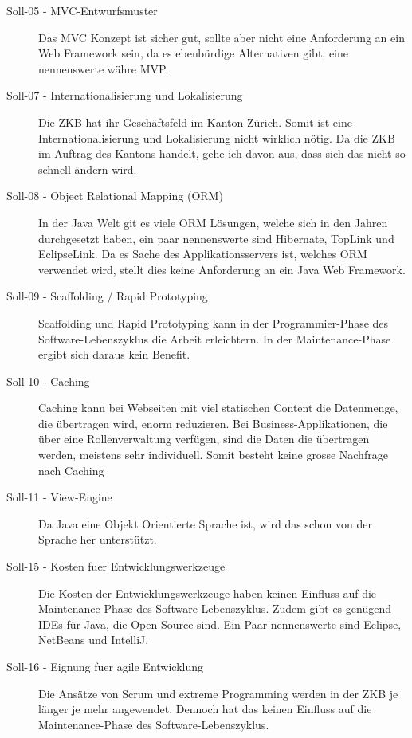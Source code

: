   \begin{description}
  \item[Soll-05 - MVC-Entwurfsmuster]
  Das \ac{MVC} Konzept ist sicher gut, sollte aber nicht eine Anforderung an ein
  Web Framework sein, da es ebenbürdige Alternativen gibt, eine nennenswerte währe
  \ac{MVP}.
  
  \item[Soll-07 - Internationalisierung und Lokalisierung]
  Die \ac{ZKB} hat ihr Geschäftsfeld im Kanton Zürich. Somit ist eine
  Internationalisierung und Lokalisierung nicht wirklich nötig. Da die \ac{ZKB}
  im Auftrag des Kantons handelt, gehe ich davon aus, dass sich das nicht so
  schnell ändern wird.
  
  \item[Soll-08 - Object Relational Mapping (ORM)]
  In der Java Welt git es viele \ac{ORM} Lösungen, welche sich in den Jahren
  durchgesetzt haben, ein paar nennenswerte sind Hibernate, TopLink und
  EclipseLink. Da es Sache des Applikationsservers ist, welches \ac{ORM}
  verwendet wird, stellt dies keine Anforderung an ein Java Web Framework.
  
  \item[Soll-09 - Scaffolding / Rapid Prototyping]
  Scaffolding und Rapid Prototyping kann in der Programmier-Phase des
  Software-Lebenszyklus die Arbeit erleichtern. In der Maintenance-Phase
  ergibt sich daraus kein Benefit.
  
  \item[Soll-10 - Caching]
  Caching kann bei Webseiten mit viel statischen Content die Datenmenge, die
  übertragen wird, enorm reduzieren. Bei Business-Applikationen, die über eine
  Rollenverwaltung verfügen, sind die Daten die übertragen werden, meistens sehr
  individuell. Somit besteht keine grosse Nachfrage nach Caching
  
  \item[Soll-11 - View-Engine]
  Da Java eine Objekt Orientierte Sprache ist, wird das schon von der Sprache
  her unterstützt.
  
  \item[Soll-15 - Kosten fuer Entwicklungswerkzeuge]
  Die Kosten der Entwicklungswerkzeuge haben keinen Einfluss auf die
  Maintenance-Phase des Software-Lebenszyklus. Zudem gibt es genügend \acp{IDE}
  für Java, die Open Source sind. Ein Paar nennenswerte sind Eclipse, NetBeans
  und IntelliJ.
  
  \item[Soll-16 - Eignung fuer agile Entwicklung]
  Die Ansätze von Scrum und extreme Programming werden in der \ac{ZKB} je länger
  je mehr angewendet. Dennoch hat das keinen Einfluss auf die Maintenance-Phase
  des Software-Lebenszyklus.
  
  \end{description}
  
